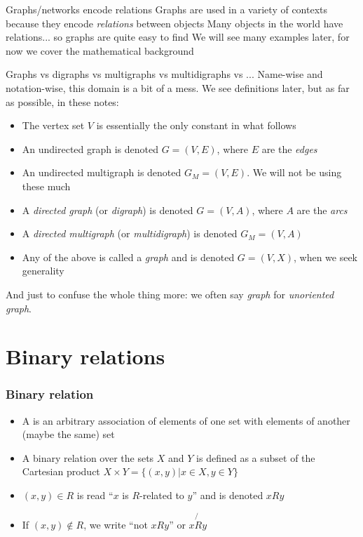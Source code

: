 \documentclass[aspectratio=43]{beamer}
\begin{document}
\begin{frame}{Graphs/networks encode relations}
	Graphs are used in a variety of contexts because they encode \emph{relations} between objects
	\vfill
	Many objects in the world have relations... so graphs are quite easy to find
	\vfill
	We will see many examples later, for now we cover the mathematical background
\end{frame}



\begin{frame}{Graphs vs digraphs vs multigraphs vs multidigraphs vs ...}
	Name-wise and notation-wise, this domain is a bit of a mess. We see definitions later, but as far as possible, in these notes:
	\begin{itemize}
		\item The vertex set $V$ is essentially the only constant in what follows
		\item An undirected graph is denoted $G=(V,E)$, where $E$ are the \emph{edges}
		\item An undirected multigraph is denoted $G_M=(V,E)$. We will not be using these much
		\item A \emph{directed graph} (or \emph{digraph}) is denoted $G=(V,A)$, where $A$ are the \emph{arcs}
		\item A \emph{directed multigraph} (or \emph{multidigraph}) is denoted $G_M=(V,A)$
		\item Any of the above is called a \emph{graph} and is denoted $G=(V,X)$, when we seek generality
	\end{itemize}
And just to confuse the whole thing more: we often say \emph{graph} for \emph{unoriented graph}.
\end{frame}

\section{Binary relations}

\begin{frame}\frametitle{Binary relation}
	\begin{definition}
	\begin{itemize}
	\item A  is an arbitrary association of elements of one set with elements of another (maybe the same) set
	\item  A binary relation over the sets $X$ and $Y$ is defined as a subset of the Cartesian product $X\times Y =\{(x,y)| x\in X , y\in Y\}$
	\item $(x,y)\in R$ is read ``$x$ is $R$-related to $y$'' and is denoted $xRy$
	\item If $(x,y)\not\in R$, we write ``not $x R y$'' or $x\not{R} y$
	\end{itemize}
	\end{definition}
\end{frame}
	
\end{document}
